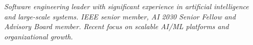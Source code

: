{\selectfont
	\begin{justify}\textit{Software engineering leader with significant experience in artificial intelligence and large-scale systems. IEEE senior member, AI 2030 Senior Fellow and Advisory Board member. Recent focus on scalable AI/ML platforms and organizational growth.}\end{justify}
}